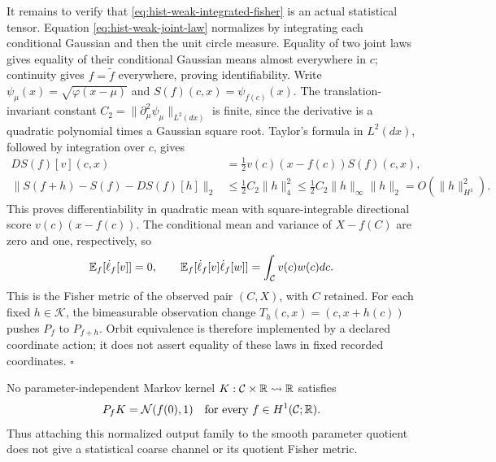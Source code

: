 It remains to verify that \eqref{eq:hist-weak-integrated-fisher} is an
actual statistical tensor. Equation \eqref{eq:hist-weak-joint-law}
normalizes by integrating each conditional Gaussian and then the unit
circle measure. Equality of two joint laws gives equality of their
conditional Gaussian means almost everywhere in \(c\); continuity gives
\(f=\widetilde f\) everywhere, proving identifiability. Write
\(\psi_\mu(x)=\sqrt{\varphi(x-\mu)}\) and
\(S(f)(c,x)=\psi_{f(c)}(x)\). The translation-invariant constant
\(C_2=\|\partial_\mu^2\psi_\mu\|_{L^2(dx)}\) is finite, since the derivative
is a quadratic polynomial times a Gaussian square root. Taylor's formula
in \(L^2(dx)\), followed by integration over \(c\), gives
\begin{equation}
\begin{split}
DS(f)[v](c,x)&=\tfrac12v(c)(x-f(c))S(f)(c,x),\\
\|S(f+h)-S(f)-DS(f)[h]\|_2
&\leq\tfrac12 C_2\|h\|_4^2
\leq\tfrac12 C_2\|h\|_\infty\|h\|_2
=O(\|h\|_{H^1}^2).
\end{split}
\label{eq:hist-weak-fisher-dqm}
\end{equation}
This proves differentiability in quadratic mean with square-integrable
directional score \(v(c)(x-f(c))\). The conditional mean and variance of
\(X-f(C)\) are zero and one, respectively, so
\begin{equation}
\mathbb E_f[\dot\ell_f[v]]=0,
\qquad
\mathbb E_f[\dot\ell_f[v]\dot\ell_f[w]]
=\int_{\mathcal C}v(c)w(c)dc.
\label{eq:hist-weak-fisher-score}
\end{equation}
This is the Fisher metric of the observed pair \((C,X)\), with \(C\)
retained. For each fixed \(h\in\mathcal K\), the bimeasurable observation
change \(T_h(c,x)=(c,x+h(c))\) pushes \(P_f\) to \(P_{f+h}\).
Orbit equivalence is therefore implemented by a declared coordinate action;
it does not assert equality of these laws in fixed recorded coordinates.
\(\square\)

No parameter-independent Markov kernel
\(K:\mathcal C\times\mathbb R\rightsquigarrow\mathbb R\) satisfies
\begin{equation}
P_fK=\mathcal N(f(0),1)
\quad\text{for every }f\in H^1(\mathcal C;\mathbb R).
\label{eq:hist-trace-channel-impossibility}
\end{equation}
Thus attaching this normalized output family to the smooth parameter
quotient does not give a statistical coarse channel or its quotient Fisher
metric. 

